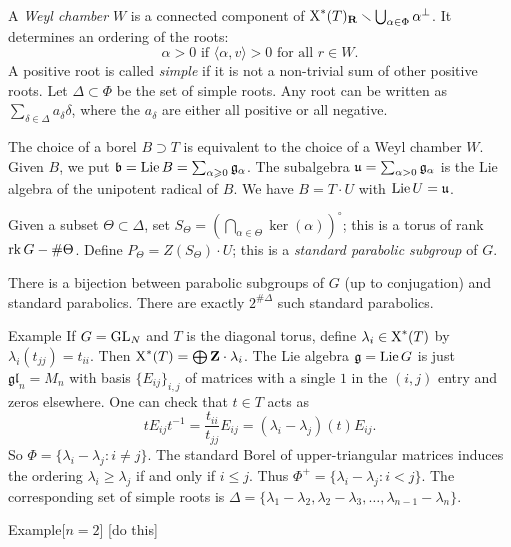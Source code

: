 A \emph{Weyl chamber} $W$ is a connected component of 
$\operatorname{X}^\ast(T)_{\mathbf{R}}\smallsetminus \bigcup_{\alpha\in \Phi} \alpha^\bot$. 
It determines an ordering of the roots: 
\[
  \alpha>0\text{ if }\langle \alpha,v\rangle>0\text{ for all }r\in W.
\]
A positive root is called \emph{simple} if it is not a non-trivial sum of 
other positive roots. Let $\Delta\subset \Phi$ be the set of simple roots. 
Any root can be written as $\sum_{\delta\in \Delta} a_\delta \delta$, where the 
$a_\delta$ are either all positive or all negative. 

The choice of a borel $B\supset T$ is equivalent to the choice of a Weyl chamber 
$W$. Given $B$, we put $\mathfrak{b}=\operatorname{Lie} B=\sum_{\alpha\geqslant 0} \mathfrak{g}_\alpha$. The 
subalgebra $\mathfrak{u}=\sum_{\alpha>0} \mathfrak{g}_\alpha$ is the Lie algebra of the unipotent 
radical of $B$. We have $B=T\cdot U$ with $\operatorname{Lie} U=\mathfrak{u}$. 

Given a subset $\Theta\subset \Delta$, set 
$S_\Theta=\left(\bigcap_{\alpha\in \Theta}\ker(\alpha)\right)^\circ$; this 
is a torus of rank $\operatorname{rk} G-\#\Theta$. Define 
$P_\Theta = Z(S_\Theta)\cdot U$; this is a \emph{standard parabolic subgroup} 
of $G$. 

\begin{theo}
There is a bijection between parabolic subgroups of $G$ (up to conjugation) 
and standard parabolics. There are exactly $2^{\# \Delta}$ such standard 
parabolics. 
\end{theo}

\begin{enonce}[remark]{Example}
If $G=\operatorname{GL}_N$ and $T$ is the diagonal torus, define  
$\lambda_i\in \operatorname{X}^\ast(T)$ by $\lambda_i(t_{j j}) = t_{i i}$. Then 
$\operatorname{X}^\ast(T)=\bigoplus \mathbf{Z}\cdot \lambda_i$. The Lie algebra 
$\mathfrak{g}=\operatorname{Lie} G$ is just $\mathfrak{gl}_n=M_n$ with basis 
$\{E_{i j}\}_{i,j}$ of matrices with a single $1$ in the $(i,j)$ entry 
and zeros elsewhere. One can check that $t\in T$ acts as 
\[
  t E_{i j} t^{-1} = \frac{t_{ii}}{t_{jj}} E_{i j} = (\lambda_i-\lambda_j)(t) E_{i j} .
\]
So $\Phi=\{\lambda_i-\lambda_j:i\ne j\}$. The standard Borel of upper-triangular 
matrices induces the ordering $\lambda_i\geqslant \lambda_j$ if and only if 
$i\leqslant j$. Thus $\Phi^+=\{\lambda_i-\lambda_j:i<j\}$. The corresponding set 
of simple roots is 
$\Delta=\{\lambda_1-\lambda_2,\lambda_2-\lambda_3,\dots,\lambda_{n-1}-\lambda_n\}$. 
\end{enonce}

\begin{enonce}[remark]{Example}[$n=2$]
[do this]
\end{enonce}

